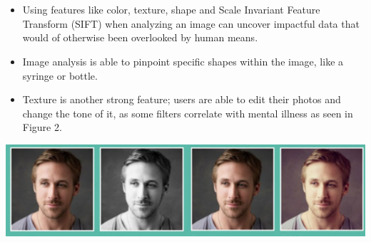 \documentclass[a0paper,portrait]{baposter}
\begin{document}
\begin{poster}
{%
\\
\\
\begin{itemize}
    \item Using features like color, texture, shape and Scale Invariant Feature Transform (SIFT) when analyzing an image can uncover impactful data that would of otherwise been overlooked by human means.
    \item Image analysis is able to pinpoint specific shapes within the image, like a syringe or bottle.
    \item Texture is another strong feature; users are able to edit their photos and change the tone of it, as some filters correlate with mental illness as seen in Figure 2.\cite{5202725}
\end{itemize}

\begin{center}
\includegraphics[width=0.49\linewidth]{Figure2}
\end{center}
}
\hfill \break 
\end{poster}
\end{document}
